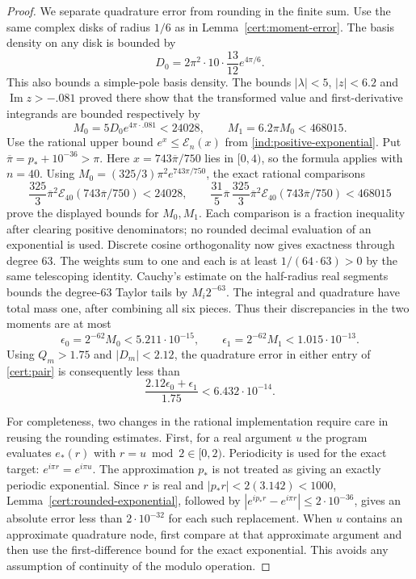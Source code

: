 \begin{proof}
We separate quadrature error from rounding in the finite sum. Use the
same complex disks of radius $1/6$ as in
Lemma~\ref{cert:moment-error}. The basis density on any disk is bounded by
\[
 D_0=2\pi^2\cdot10\cdot\frac{13}{12}e^{4\pi/6}.
\]
This also bounds a simple-pole basis density. The bounds
$|\lambda|<5$, $|z|<6.2$ and $\operatorname{Im}z>-.081$ proved there
show that the transformed value and first-derivative integrands are
bounded respectively by
\[
 M_0=5D_0e^{4\pi\cdot.081}<24028,
 \qquad M_1=6.2\pi M_0<468015.
\]
Use the rational upper bound $e^x\le\mathcal E_n(x)$ from
\eqref{ind:positive-exponential}.  Put
$\overline\pi=p_*+10^{-36}>\pi$.  Here
$x=743\overline\pi/750$ lies in $[0,4)$, so the formula applies with $n=40$.
Using $M_0=(325/3)\pi^2e^{743\pi/750}$, the exact rational comparisons
\[
 \frac{325}{3}\overline\pi^2 \mathcal E_{40}(743\overline\pi/750)<24028,
 \qquad
 \frac{31}{5}\overline\pi\,
 \frac{325}{3}\overline\pi^2 \mathcal E_{40}(743\overline\pi/750)<468015
\]
prove the displayed bounds for $M_0,M_1$.  Each comparison is a fraction
inequality after clearing positive denominators; no rounded decimal
evaluation of an exponential is used.
Discrete cosine orthogonality now gives exactness through degree $63$.
The weights sum to one and each is at least $1/(64\cdot63)>0$ by
the same telescoping identity. Cauchy's estimate on the half-radius
real segments bounds the degree-$63$ Taylor tails by $M_i2^{-63}$.
The integral and quadrature have total mass one, after combining all
six pieces. Thus their discrepancies in the two moments are at most
\[
 \epsilon_0=2^{-62}M_0<5.211\cdot10^{-15},\qquad
 \epsilon_1=2^{-62}M_1<1.015\cdot10^{-13}.
\]
Using $Q_m>1.75$ and $|D_m|<2.12$, the quadrature error in either
entry of \eqref{cert:pair} is consequently less than
\begin{equation}\label{cert:rational-small-quadrature}
 \frac{2.12\epsilon_0+\epsilon_1}{1.75}<6.432\cdot10^{-14}.
\end{equation}

For completeness, two changes in the rational implementation require
care in reusing the rounding estimates. First, for a real argument $u$
the program evaluates $e_*(r)$ with $r=u\bmod2\in[0,2)$.
Periodicity is used for the exact target:
$e^{i\pi r}=e^{i\pi u}$. The approximation $p_*$ is not treated as
giving an exactly periodic exponential.  Since $r$ is real and
$|p_*r|<2(3.142)<1000$, Lemma~\ref{cert:rounded-exponential}, followed by
$|e^{ip_*r}-e^{i\pi r}|\le2\cdot10^{-36}$, gives an absolute error
less than $2\cdot10^{-32}$ for each such replacement. When $u$
contains an approximate quadrature node, first compare at that
approximate argument and then use the first-difference bound for the
exact exponential. This avoids any assumption of continuity of the
modulo operation.


\end{proof}

